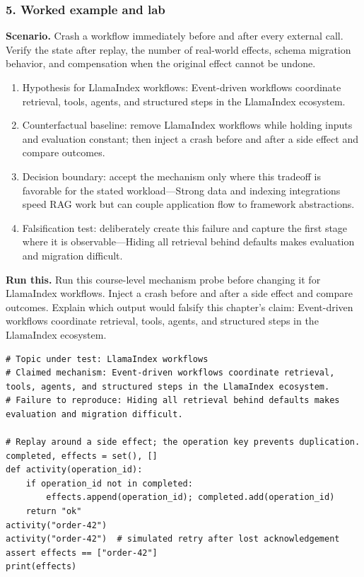 \subsubsection*{5. Worked example and lab}
\textbf{Scenario.} Crash a workflow immediately before and after every external call. Verify the state after replay, the number of real-world effects, schema migration behavior, and compensation when the original effect cannot be undone.
\begin{enumerate}
\item Hypothesis for LlamaIndex workflows: Event-driven workflows coordinate retrieval, tools, agents, and structured steps in the LlamaIndex ecosystem.
\item Counterfactual baseline: remove LlamaIndex workflows while holding inputs and evaluation constant; then inject a crash before and after a side effect and compare outcomes.
\item Decision boundary: accept the mechanism only where this tradeoff is favorable for the stated workload—Strong data and indexing integrations speed RAG work but can couple application flow to framework abstractions.
\item Falsification test: deliberately create this failure and capture the first stage where it is observable—Hiding all retrieval behind defaults makes evaluation and migration difficult.
\end{enumerate}
\textbf{Run this.} Run this course-level mechanism probe before changing it for LlamaIndex workflows. Inject a crash before and after a side effect and compare outcomes. Explain which output would falsify this chapter's claim: Event-driven workflows coordinate retrieval, tools, agents, and structured steps in the LlamaIndex ecosystem.
\begin{Verbatim}[fontsize=\scriptsize]
# Topic under test: LlamaIndex workflows
# Claimed mechanism: Event-driven workflows coordinate retrieval, tools, agents, and structured steps in the LlamaIndex ecosystem.
# Failure to reproduce: Hiding all retrieval behind defaults makes evaluation and migration difficult.

# Replay around a side effect; the operation key prevents duplication.
completed, effects = set(), []
def activity(operation_id):
    if operation_id not in completed:
        effects.append(operation_id); completed.add(operation_id)
    return "ok"
activity("order-42")
activity("order-42")  # simulated retry after lost acknowledgement
assert effects == ["order-42"]
print(effects)
\end{Verbatim}
